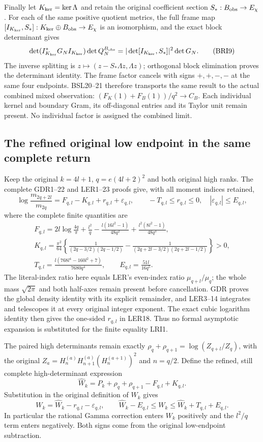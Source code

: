 Finally let $K_{\rm ker}=\ker\Lambda$ and retain the original
coefficient section $S_*:B_{\rm obs}\to E_\chi$.
For each of the same positive quotient metrics, the full frame map
$[I_{K_{\rm ker}},S_*]:K_{\rm ker}\oplus B_{\rm obs}\to E_\chi$
is an isomorphism, and the exact block determinant gives
\[
 \det(I_{K_{\rm ker}}^*G_NI_{K_{\rm ker}})\det Q_N^{B_{\rm obs}}
 =|\det[I_{K_{\rm ker}},S_*]|^2\det G_N.
 \tag{BRI9}
\]
The inverse splitting is $z\mapsto(z-S_*\Lambda z,\Lambda z)$;
orthogonal block elimination proves the determinant identity.
The frame factor cancels with signs $+,+,-,-$ at the same four
endpoints. BSL20--21 therefore transports the same result to the
actual combined mixed observation:
$(F_K(1)+F_B(1))/q^2\to C_B$. Each individual kernel and
boundary Gram, its off-diagonal entries and its Taylor unit
remain present. No individual factor is assigned the combined limit.


\subsection{The refined original low endpoint in the same complete return}

Keep the original $k=4l+1$, $q=e(4l+2)^2$ and both original
high ranks. The complete GDR1--22 and LER1--23 proofs give,
with all moment indices retained,
\[
 \log\frac{m_{2q+2l}}{m_{2q}}
 =F_{q,l}-K_{q,l}+r_{q,l}+\varepsilon_{q,l},\qquad
 -T_{q,l}\leq r_{q,l}\leq0,\quad
 |\varepsilon_{q,l}|\leq E_{q,l},
 \tag{LRI1}
\]
where the complete finite quantities are
\[
\begin{gathered}
 F_{q,l}=2l\log\frac{4q}{\pi}+\frac{l^2}{q}
 -\frac{l(16l^2-1)}{48q^2}
 +\frac{l^2(8l^2-1)}{48q^3},\\
 K_{q,l}=\frac{\pi^2}{64}\left\{
 \frac1{(2q-3/2)(2q-1/2)}
 -\frac1{(2q+2l-3/2)(2q+2l-1/2)}\right\}>0,\\
 T_{q,l}=\frac{l(768l^4-160l^2+7)}{7680q^4},\qquad
 E_{q,l}=\frac{51l}{16q^5}.
\end{gathered}\tag{LRI2}
\]
The literal-index ratio here equals LER's even-index ratio
$\mu_{q+l}/\mu_q$; the whole mass $\sqrt{2\pi}$ and both
half-axes remain present before cancellation. GDR proves the
global density identity with its explicit remainder, and LER3--14
integrates and telescopes it at every original integer exponent.
The exact cubic logarithm identity then gives the one-sided
$r_{q,l}$ in LER18. Thus no formal asymptotic expansion is
substituted for the finite equality LRI1.

The paired high determinants remain exactly
$\rho_q+\rho_{q+1}=\log(Z_{q+l}/Z_q)$, with the original
$Z_a=H_n^{(a)}H_{n+1}^{(a)}(H_n^{(a+1)})^2$ and $n=q/2$.
Define the refined, still complete high-determinant expression
\[
 \widehat W_k=P_k+\rho_q+\rho_{q+1}-F_{q,l}+K_{q,l}.
\]
Substitution in the original definition of $W_k$ gives
\[
 W_k=\widehat W_k-r_{q,l}-\varepsilon_{q,l},\qquad
 \widehat W_k-E_{q,l}\leq W_k
                  \leq\widehat W_k+T_{q,l}+E_{q,l}.
 \tag{LRI3}
\]
In particular the rational Gamma correction enters $W_k$
positively and the $l^2/q$ term enters negatively. Both signs
come from the original low-endpoint subtraction.

